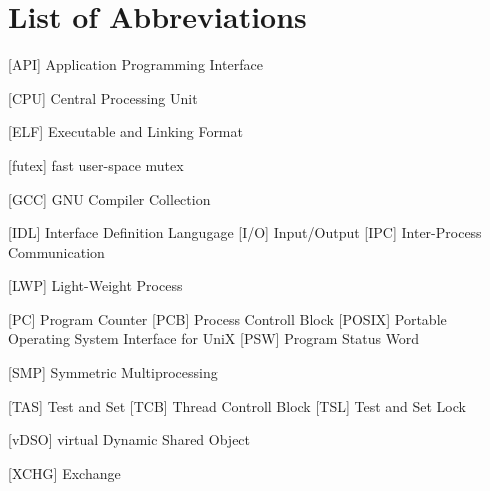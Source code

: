 
\chapter*{List of Abbreviations}

\begin{acronym} [POSIX]
 [API] {Application Programming Interface}


 [CPU] {Central Processing Unit}


 [ELF] {Executable and Linking Format}

 [futex] {fast user-space mutex}

 [GCC] {GNU Compiler Collection}


 [IDL] {Interface Definition Langugage}
 [I/O] {Input/Output}
[IPC] {Inter-Process Communication}



 [LWP] {Light-Weight Process}




 [PC] {Program Counter}
 [PCB] {Process Controll Block}
 [POSIX] {Portable Operating System Interface for UniX}
 [PSW] {Program Status Word}



 [SMP] {Symmetric Multiprocessing}

 [TAS] {Test and Set}
 [TCB] {Thread Controll Block}
 [TSL] {Test and Set Lock}


 [vDSO] {virtual Dynamic Shared Object}


 [XCHG] {Exchange}



\end{acronym} 
